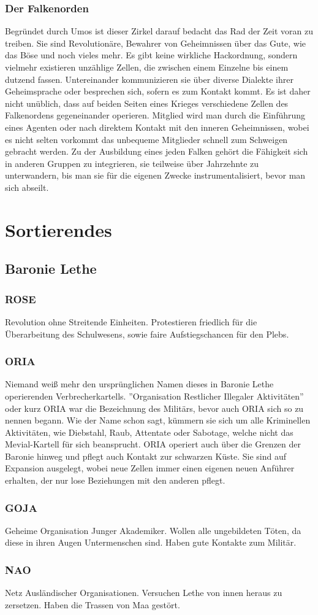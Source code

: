\documentclass[a4paper,12pt,oneside]{book}
\begin{document}
\section{Der Falkenorden}
Begründet durch Umos ist dieser Zirkel darauf bedacht das Rad der Zeit voran zu treiben. Sie sind Revolutionäre, Bewahrer von Geheimnissen über das Gute, wie das Böse und noch vieles mehr. Es gibt keine wirkliche Hackordnung, sondern vielmehr existieren unzählige Zellen, die zwischen einem Einzelne bis einem dutzend fassen. Untereinander kommunizieren sie über diverse Dialekte ihrer Geheimsprache oder besprechen sich, sofern es zum Kontakt kommt. Es ist daher nicht unüblich, dass auf beiden Seiten eines Krieges verschiedene Zellen des Falkenordens gegeneinander operieren. Mitglied wird man durch die Einführung eines Agenten oder nach direktem Kontakt mit den inneren Geheimnissen, wobei es nicht selten vorkommt das unbequeme Mitglieder schnell zum Schweigen gebracht werden. Zu der Ausbildung eines jeden Falken gehört die Fähigkeit sich in anderen Gruppen zu integrieren, sie teilweise über Jahrzehnte zu unterwandern, bis man sie für die eigenen Zwecke instrumentalisiert, bevor man sich abseilt. 

\part{Sortierendes}

\chapter{Baronie Lethe}

\section{ROSE}
Revolution ohne Streitende Einheiten. Protestieren friedlich für die Überarbeitung des Schulwesens, sowie faire Aufstiegschancen für den Plebs.

\section{ORIA}
Niemand weiß mehr den ursprünglichen Namen dieses in Baronie Lethe operierenden Verbrecherkartells. ''Organisation Restlicher Illegaler Aktivitäten'' oder kurz ORIA war die Bezeichnung des Militärs, bevor auch ORIA sich so zu nennen begann. Wie der Name schon sagt, kümmern sie sich um alle Kriminellen Aktivitäten, wie Diebstahl, Raub, Attentate oder Sabotage, welche nicht das Mevial-Kartell für sich beansprucht. ORIA operiert auch über die Grenzen der Baronie hinweg und pflegt auch Kontakt zur schwarzen Küste. Sie sind auf Expansion ausgelegt, wobei neue Zellen immer einen eigenen neuen Anführer erhalten, der nur lose Beziehungen mit den anderen pflegt.

\section{GOJA}
Geheime Organisation Junger Akademiker. Wollen alle ungebildeten Töten, da diese in ihren Augen Untermenschen sind. Haben gute Kontakte zum Militär.
   
\section{NAO}
Netz Ausländischer Organisationen. Versuchen Lethe von innen heraus zu zersetzen. Haben die Trassen von Maa gestört.
\end{document}
